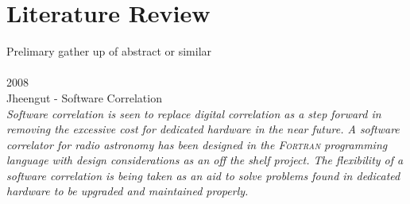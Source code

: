 \chapter{Literature Review}
\label{litReview}


{\Large Prelimary gather up of abstract or similar}\\
\hfill\\
{\large 2008}\\
{\large Jheengut - Software Correlation}\\
\indent
\textit{Software correlation is seen to replace digital correlation as a step forward in removing the excessive cost for dedicated hardware in the near future. A software correlator for radio astronomy has been designed in the {\textsc{Fortran}} programming language with design considerations as an off the shelf project. The flexibility of a software correlation is being taken as an aid to solve problems found in dedicated hardware to be upgraded and maintained properly. 
}\\

